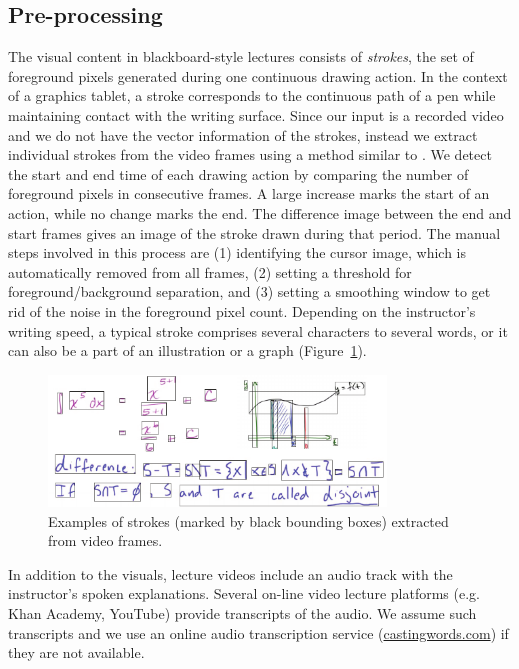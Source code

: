 \subsection{Pre-processing}
The visual content in blackboard-style lectures consists of \emph{strokes},
the set of foreground pixels generated during one continuous drawing action.
In the context of a graphics tablet, a stroke corresponds to the continuous
path of a pen while maintaining contact with the writing surface. 
Since our input is a recorded video and we do not have the vector information of the strokes, instead we extract
individual strokes from the video frames using a method similar to
\cite{monserrat2013notevideo}.  We detect the start and end time of
each drawing action by comparing the number of foreground pixels in
consecutive frames. A large increase marks the start of an action,
while no change marks the end. The difference image between the end
and start frames gives an image of the stroke drawn during that
period.
The manual steps involved in this process are (1) identifying the cursor image, which is automatically removed from all frames, (2) setting a threshold for foreground/background separation, and (3)  setting a smoothing window to get rid of the noise in the foreground pixel count. Depending on the instructor's writing speed, a typical stroke
comprises several characters to several words, or it can also be a
part of an illustration or a graph (Figure~\ref{Fig:stroke_examples}).\\
%
\begin{figure}[h!]
    \centering
        \includegraphics[width=0.8\textwidth]{figures/strokes.pdf}
    \caption{Examples of strokes (marked by black bounding boxes) extracted from video frames.} 
    \label{Fig:stroke_examples}
\end{figure}

In addition
to the visuals, lecture videos include an audio track with the instructor's
spoken explanations. Several on-line video lecture platforms (e.g. Khan Academy,
YouTube) provide transcripts of the audio. We assume such transcripts and
we use an online audio transcription service (\url{castingwords.com}) if they are
not available. 
%
